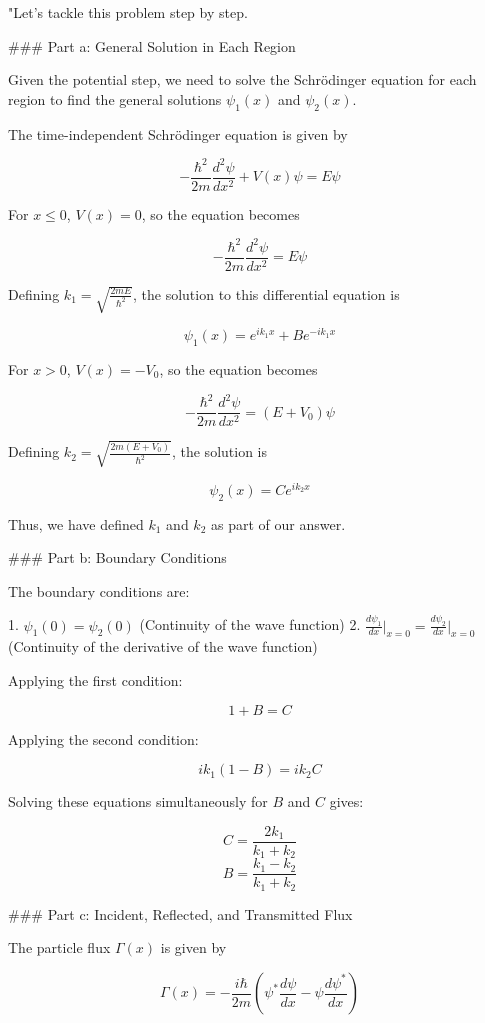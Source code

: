 "Let's tackle this problem step by step.

### Part a: General Solution in Each Region

Given the potential step, we need to solve the Schrödinger equation for each region to find the general solutions \(\psi_1(x)\) and \(\psi_2(x)\).

The time-independent Schrödinger equation is given by

\[
-\frac{\hbar^2}{2m} \frac{d^2\psi}{dx^2} + V(x)\psi = E\psi
\]

For \(x \leq 0\), \(V(x) = 0\), so the equation becomes

\[
-\frac{\hbar^2}{2m} \frac{d^2\psi}{dx^2} = E\psi
\]

Defining \(k_1 = \sqrt{\frac{2mE}{\hbar^2}}\), the solution to this differential equation is

\[
\psi_1(x) = e^{ik_1x} + Be^{-ik_1x}
\]

For \(x > 0\), \(V(x) = -V_0\), so the equation becomes

\[
-\frac{\hbar^2}{2m} \frac{d^2\psi}{dx^2} = (E + V_0)\psi
\]

Defining \(k_2 = \sqrt{\frac{2m(E+V_0)}{\hbar^2}}\), the solution is

\[
\psi_2(x) = Ce^{ik_2x}
\]

Thus, we have defined \(k_1\) and \(k_2\) as part of our answer.

### Part b: Boundary Conditions

The boundary conditions are:

1. \(\psi_1(0) = \psi_2(0)\) (Continuity of the wave function)
2. \(\frac{d\psi_1}{dx}\bigg|_{x=0} = \frac{d\psi_2}{dx}\bigg|_{x=0}\) (Continuity of the derivative of the wave function)

Applying the first condition:

\[
1 + B = C
\]

Applying the second condition:

\[
ik_1(1 - B) = ik_2C
\]

Solving these equations simultaneously for \(B\) and \(C\) gives:

\[
C = \frac{2k_1}{k_1+k_2}
\]
\[
B = \frac{k_1-k_2}{k_1+k_2}
\]

### Part c: Incident, Reflected, and Transmitted Flux

The particle flux \(\Gamma(x)\) is given by

\[
\Gamma(x) = -\frac{i\hbar}{2m} \left(\psi^{*}\frac{d\psi}{dx} - \psi\frac{d\psi^{*}}{dx} \right)
\]

